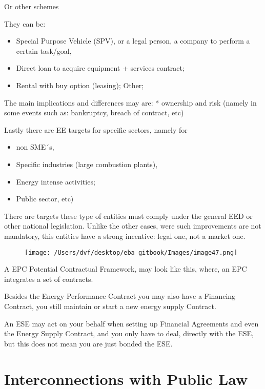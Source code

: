 \documentclass[]{book}
\providecommand{\tightlist}{%
  \setlength{\itemsep}{0pt}\setlength{\parskip}{0pt}}
\theoremstyle{definition}
\theoremstyle{definition}
\theoremstyle{definition}
\theoremstyle{remark}
\begin{document}
Or other schemes

They can be:

\begin{itemize}
\tightlist
\item
  Special Purpose Vehicle (SPV), or a legal person, a company to perform
  a certain task/goal,
\item
  Direct loan to acquire equipment + services contract;
\item
  Rental with buy option (leasing); Other;
\end{itemize}

The main implications and differences may are: * ownership and risk
(namely in some events such as: bankruptcy, breach of contract, etc)

Lastly there are EE targets for specific sectors, namely for

\begin{itemize}
\tightlist
\item
  non SME´s,
\item
  Specific industries (large combustion plants),
\item
  Energy intense activities;
\item
  Public sector, etc)
\end{itemize}

There are targets these type of entities must comply under the general
EED or other national legislation. Unlike the other cases, were such
improvements are not mandatory, this entities have a strong incentive:
legal one, not a market one.

\begin{figure}[htbp]
\centering
\texttt{[image: /Users/dvf/desktop/eba gitbook/Images/image47.png]}
\caption{}
\end{figure}

A EPC Potential Contractual Framework, may look like this, where, an EPC
integrates a set of contracts.

Besides the Energy Performance Contract you may also have a Financing
Contract, you still maintain or start a new energy supply Contract.

An ESE may act on your behalf when setting up Financial Agreements and
even the Energy Supply Contract, and you only have to deal, directly
with the ESE, but this does not mean you are just bonded the ESE.

\section{Interconnections with Public
Law}\label{interconnections-with-public-law}
\end{document}
